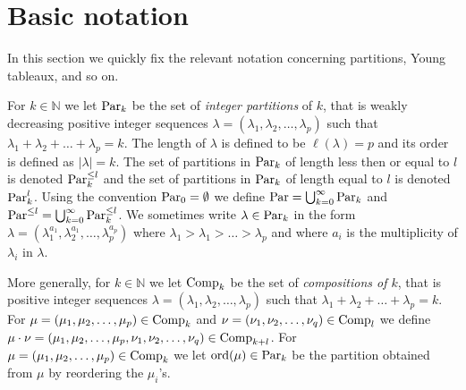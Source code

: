 \documentclass[10pt,hidelinks]{article}
\newcommand{\ord}{{\rm{ord}}}
\newcommand{\N}{ { \mathbb N}}
\newcommand{\Par}{{\rm Par}   }
\newcommand{\Comp}{{\rm Comp}   }
\numberwithin{equation}{section}
\begin{document}
\section{Basic notation}\label{Basic notation}
In this section we quickly fix the relevant notation concerning partitions, Young tableaux, and so on.

\medskip
For $ k \in \N$ we let $\Par_k $ be the set of {\it integer partitions} of $ k $, that is 
weakly decreasing
positive integer sequences $ \lambda=(\lambda_1, \lambda_2, \ldots, \lambda_p ) $
such that $ \lambda_1+\lambda_2+\ldots + \lambda_p = k$.
The length of $ \lambda $ is defined to be $ \ell(\lambda) = p $ and its order is defined as $ | \lambda | = k $. 
The set of partitions in $ \Par_k $ of length less then or equal to $ l $ is denoted
$  \Par_k^{\le l } $ and
the set of partitions in $ \Par_k $ of length equal to $ l $ is denoted
$  \Par_k^{l } $. 
Using the convention $ \Par_0 = \emptyset $ we define
$ \Par= \bigcup_{ k=0}^{\infty} \Par_k $ and $ \Par^{\le l }= \bigcup_{ k=0}^{\infty} \Par_k^{\le l } $. 
We sometimes write $ \lambda \in \Par_k $ in the form $ \lambda=
(\lambda_1^{a_1}, \lambda_2^{a_1}, \ldots, \lambda_p^{a_p} ) $ where $ \lambda_1 >
\lambda_1 >  \ldots > \lambda_p  $ and where $ a_i$ is the multiplicity of $ \lambda_i $ in $ \lambda$. 



\medskip
More generally, for $ k \in \N$ we let $\Comp_k $ be the set of {\it compositions of $k$},
that is positive integer sequences $ \lambda=(\lambda_1, \lambda_2, \ldots, \lambda_p ) $
such that $ \lambda_1+\lambda_2+\ldots + \lambda_p = k$.
For $ \mu = (\mu_1, \mu_2, \ldots, \mu_p ) \in \Comp_k $ and $ \nu = (\nu_1, \nu_2, \ldots, \nu_q ) \in \Comp_l $ 
we define $ \mu \cdot \nu = (\mu_1, \mu_2, \ldots, \mu_p, \nu_1, \nu_2, \ldots, \nu_q ) \in \Comp_{k+l} $.
For $ \mu =  (\mu_1, \mu_2, \ldots, \mu_p ) \in \Comp_k $
we let $ \ord(\mu) \in \Par_k $ be the partition obtained
from $ \mu $ 
by reordering the $ \mu_i$'s. 
\end{document}
